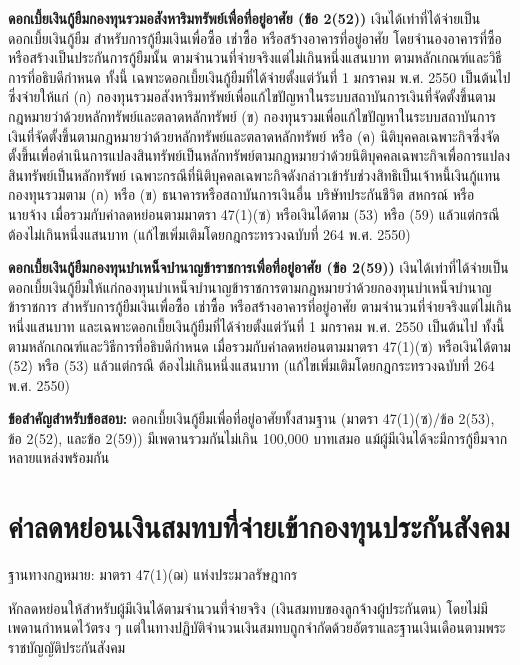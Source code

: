 \documentclass[12pt,a4paper]{article}
\newcommand{\hilight}[1]{\textbf{#1}}
\begin{document}
\textbf{ดอกเบี้ยเงินกู้ยืมกองทุนรวมอสังหาริมทรัพย์เพื่อที่อยู่อาศัย (ข้อ 2(52))} เงินได้เท่าที่ได้จ่ายเป็นดอกเบี้ยเงินกู้ยืม สำหรับการกู้ยืมเงินเพื่อซื้อ เช่าซื้อ หรือสร้างอาคารที่อยู่อาศัย โดยจำนองอาคารที่ซื้อหรือสร้างเป็นประกันการกู้ยืมนั้น ตามจำนวนที่จ่ายจริงแต่ไม่เกินหนึ่งแสนบาท ตามหลักเกณฑ์และวิธีการที่อธิบดีกำหนด ทั้งนี้ เฉพาะดอกเบี้ยเงินกู้ยืมที่ได้จ่ายตั้งแต่วันที่ 1 มกราคม พ.ศ. 2550 เป็นต้นไป ซึ่งจ่ายให้แก่ (ก) กองทุนรวมอสังหาริมทรัพย์เพื่อแก้ไขปัญหาในระบบสถาบันการเงินที่จัดตั้งขึ้นตามกฎหมายว่าด้วยหลักทรัพย์และตลาดหลักทรัพย์ (ข) กองทุนรวมเพื่อแก้ไขปัญหาในระบบสถาบันการเงินที่จัดตั้งขึ้นตามกฎหมายว่าด้วยหลักทรัพย์และตลาดหลักทรัพย์ หรือ (ค) นิติบุคคลเฉพาะกิจซึ่งจัดตั้งขึ้นเพื่อดำเนินการแปลงสินทรัพย์เป็นหลักทรัพย์ตามกฎหมายว่าด้วยนิติบุคคลเฉพาะกิจเพื่อการแปลงสินทรัพย์เป็นหลักทรัพย์ เฉพาะกรณีที่นิติบุคคลเฉพาะกิจดังกล่าวเข้ารับช่วงสิทธิเป็นเจ้าหนี้เงินกู้แทนกองทุนรวมตาม (ก) หรือ (ข) ธนาคารหรือสถาบันการเงินอื่น บริษัทประกันชีวิต สหกรณ์ หรือนายจ้าง เมื่อรวมกับค่าลดหย่อนตามมาตรา 47(1)(ซ) หรือเงินได้ตาม (53) หรือ (59) แล้วแต่กรณี ต้องไม่เกินหนึ่งแสนบาท (แก้ไขเพิ่มเติมโดยกฎกระทรวงฉบับที่ 264 พ.ศ. 2550)

\textbf{ดอกเบี้ยเงินกู้ยืมกองทุนบำเหน็จบำนาญข้าราชการเพื่อที่อยู่อาศัย (ข้อ 2(59))} เงินได้เท่าที่ได้จ่ายเป็นดอกเบี้ยเงินกู้ยืมให้แก่กองทุนบำเหน็จบำนาญข้าราชการตามกฎหมายว่าด้วยกองทุนบำเหน็จบำนาญข้าราชการ สำหรับการกู้ยืมเงินเพื่อซื้อ เช่าซื้อ หรือสร้างอาคารที่อยู่อาศัย ตามจำนวนที่จ่ายจริงแต่ไม่เกินหนึ่งแสนบาท และเฉพาะดอกเบี้ยเงินกู้ยืมที่ได้จ่ายตั้งแต่วันที่ 1 มกราคม พ.ศ. 2550 เป็นต้นไป ทั้งนี้ตามหลักเกณฑ์และวิธีการที่อธิบดีกำหนด เมื่อรวมกับค่าลดหย่อนตามมาตรา 47(1)(ซ) หรือเงินได้ตาม (52) หรือ (53) แล้วแต่กรณี ต้องไม่เกินหนึ่งแสนบาท (แก้ไขเพิ่มเติมโดยกฎกระทรวงฉบับที่ 264 พ.ศ. 2550)

\hilight{ข้อสำคัญสำหรับข้อสอบ:} ดอกเบี้ยเงินกู้ยืมเพื่อที่อยู่อาศัยทั้งสามฐาน (มาตรา 47(1)(ซ)/ข้อ 2(53), ข้อ 2(52), และข้อ 2(59)) มีเพดานรวมกันไม่เกิน 100,000 บาทเสมอ แม้ผู้มีเงินได้จะมีการกู้ยืมจากหลายแหล่งพร้อมกัน

\newpage
\section{ค่าลดหย่อนเงินสมทบที่จ่ายเข้ากองทุนประกันสังคม}

ฐานทางกฎหมาย: มาตรา 47(1)(ฌ) แห่งประมวลรัษฎากร

หักลดหย่อนให้สำหรับผู้มีเงินได้ตามจำนวนที่จ่ายจริง (เงินสมทบของลูกจ้างผู้ประกันตน) โดยไม่มีเพดานกำหนดไว้ตรง ๆ แต่ในทางปฏิบัติจำนวนเงินสมทบถูกจำกัดด้วยอัตราและฐานเงินเดือนตามพระราชบัญญัติประกันสังคม
\end{document}
